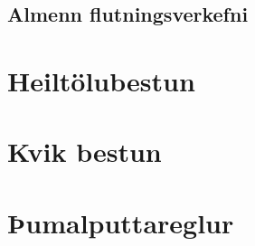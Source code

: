 \documentclass[a5paper]{book}
\begin{document}
\section{Almenn flutningsverkefni}
 
\chapter{Heiltölubestun} \label{ch:ip}

\chapter{Kvik bestun} 

\chapter{Þumalputtareglur}



\backmatter


\printindex
\end{document}
